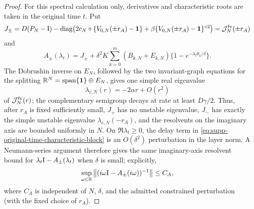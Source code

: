 \begin{proof}
For this spectral calculation only, derivatives and characteristic roots are
taken in the original time \(t\).  Put
\begin{equation}
 J_\pm=D(P_N-\mathrm I)-\operatorname{diag}\!\left(
 2c_N\circ\{V_{0,N}(\pm r_A)-\mathbf1\}
 +\beta\{V_{0,N}(\pm r_A)-\mathbf1\}^{\circ2}\right)
 =\mathcal J_N^{\rm fv}(\pm r_A)
 \label{eq:supp-outer-voltage-jacobian}
\end{equation}
and
\begin{equation}
 A_\pm(\lambda_t)
 =J_\pm+\delta^2K\sum_{k=0}^m(B_{k,N}+E_{k,N})
       \{1-e^{-\lambda_t\theta_k/\delta}\}.
 \label{eq:supp-original-time-characteristic-block}
\end{equation}
The Dobrushin inverse on \(E_N\), followed by the two invariant-graph
equations for the splitting
\(\mathbb R^N=\operatorname{span}\{\mathbf1\}\oplus E_N\), gives one simple real
eigenvalue
\[
 \lambda_{c,N}(r)=-2\alpha r+O(r^2)
\]
of \(\mathcal J_N^{\rm fv}(r)\); the complementary semigroup decays at rate
at least \(D\gamma/2\).  Thus, after \(r_A\) is fixed sufficiently small,
\(J_+\) has no unstable eigenvalue, \(J_-\) has exactly the simple unstable
eigenvalue \(\lambda_{c,N}(-r_A)\), and the resolvents on the imaginary axis
are bounded uniformly in \(N\).  On \(\Re\lambda_t\ge0\), the delay term in
\cref{eq:supp-original-time-characteristic-block} is an
\(O(\delta^2)\) perturbation in the layer norm.  A Neumann-series argument
therefore gives the same imaginary-axis resolvent bound for
\(\lambda_t\mathrm I-A_\pm(\lambda_t)\) when \(\delta\) is small; explicitly,
\begin{equation}
 \sup_{\omega\in\mathbb R}
 \left\lVert(i\omega\mathrm I-A_\pm(i\omega))^{-1}\right\rVert
 \le C_A,
 \label{eq:supp-outer-imaginary-resolvent}
\end{equation}
where \(C_A\) is independent of \(N\), \(\delta\), and the admitted
constrained perturbation (with the fixed choice of \(r_A\)).


\end{proof}

